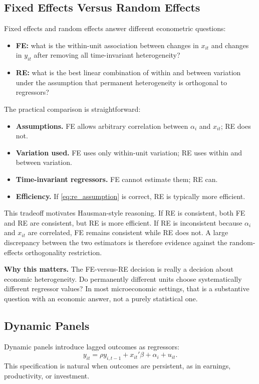 \subsection{Fixed Effects Versus Random Effects}
Fixed effects and random effects answer different econometric questions:
\begin{itemize}
\item \textbf{FE:} what is the within-unit association between changes in $x_{it}$ and changes in $y_{it}$ after removing all time-invariant heterogeneity?
\item \textbf{RE:} what is the best linear combination of within and between variation under the assumption that permanent heterogeneity is orthogonal to regressors?
\end{itemize}

The practical comparison is straightforward:
\begin{itemize}
\item \textbf{Assumptions.} FE allows arbitrary correlation between $\alpha_i$ and $x_{it}$; RE does not.
\item \textbf{Variation used.} FE uses only within-unit variation; RE uses within and between variation.
\item \textbf{Time-invariant regressors.} FE cannot estimate them; RE can.
\item \textbf{Efficiency.} If \eqref{eq:re_assumption} is correct, RE is typically more efficient.
\end{itemize}

This tradeoff motivates Hausman-style reasoning. If RE is consistent, both FE and RE are consistent, but RE is more efficient. If RE is inconsistent because $\alpha_i$ and $x_{it}$ are correlated, FE remains consistent while RE does not. A large discrepancy between the two estimators is therefore evidence against the random-effects orthogonality restriction.

\begin{boxD}
\textbf{Why this matters.}
The FE-versus-RE decision is really a decision about economic heterogeneity. Do permanently different units choose systematically different regressor values? In most microeconomic settings, that is a substantive question with an economic answer, not a purely statistical one.
\end{boxD}

\subsection{Dynamic Panels}
Dynamic panels introduce lagged outcomes as regressors:
\begin{equation}
y_{it} = \rho y_{i,t-1} + x_{it}'\beta + \alpha_i + u_{it}.
\label{eq:dynamic_panel}
\end{equation}
This specification is natural when outcomes are persistent, as in earnings, productivity, or investment.

